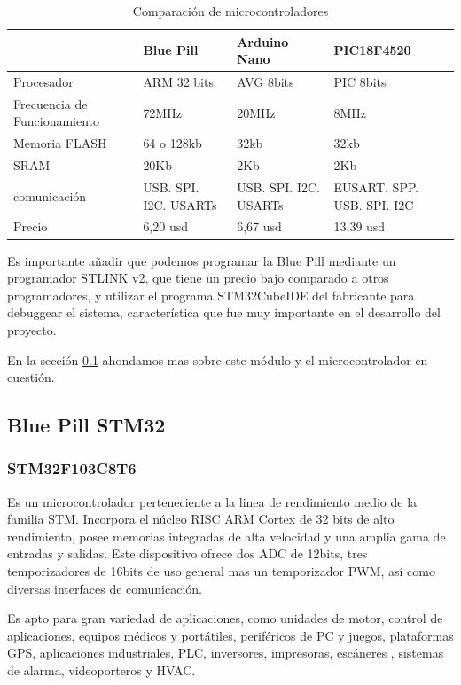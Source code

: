 \begin{table}[t]
    \begin{center}
        \begin{tabular}{ | m{3cm} | m{3cm} | m{3cm} | m{3cm} | }
        \hline  & Blue Pill & Arduino Nano & PIC18F4520  \\ \hline
        Procesador & ARM 32 bits & AVG 8bits & PIC 8bits \\ \hline
        Frecuencia de Funcionamiento & 72MHz &20MHz & 8MHz \\ \hline
        Memoria FLASH & 64 o 128kb & 32kb & 32kb\\ \hline
        SRAM & 20Kb & 2Kb & 2Kb \\ \hline
        comunicación & USB. SPI. I2C. USARTs &  USB. SPI. I2C. USARTs & EUSART. SPP. USB. SPI. I2C\\ \hline
        Precio & 6,20 usd &  6,67 usd & 13,39 usd\\ \hline
        
        \end{tabular}
        \caption{Comparación de microcontroladores}
        \label{tab:uC}   
    \end{center}
\end{table}

Es importante añadir que podemos programar la Blue Pill mediante un programador STLINK v2, que tiene un precio bajo comparado a otros programadores, y
utilizar el programa STM32CubeIDE del fabricante para debuggear el sistema, característica que fue muy importante en el desarrollo del proyecto.\par
En la sección \ref{cap:stm32} ahondamos mas sobre este módulo y el microcontrolador en cuestión. 

\subsection{Blue Pill STM32} \label{cap:stm32}
\subsubsection{STM32F103C8T6}

Es un microcontrolador perteneciente a la linea de rendimiento medio de la familia STM. Incorpora el núcleo RISC ARM Cortex de 32 bits de alto rendimiento,
posee memorias integradas de alta velocidad y una amplia gama de entradas y salidas. Este dispositivo ofrece dos ADC de 12bits, tres temporizadores de 16bits
de uso general mas un temporizador PWM, así como diversas interfaces de comunicación.\par 
Es apto para gran variedad de aplicaciones, como unidades de motor, control de aplicaciones, equipos médicos y portátiles, periféricos
de PC y juegos, plataformas GPS, aplicaciones industriales, PLC, inversores, impresoras, escáneres , sistemas de alarma, videoporteros y HVAC.

